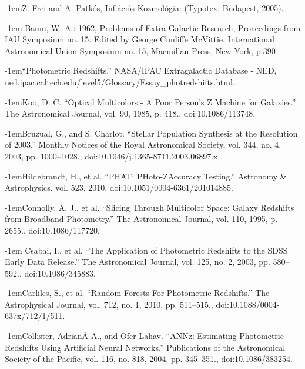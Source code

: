 \documentclass[12pt,letterpaper,oneside,openright]{book}
\begin{document}
\begin{thebibliography}{99\kern\bibindent}
\def\bibindent{1em}

\makeatletter
\let\old@biblabel\@biblabel
\def\@biblabel#1{\old@biblabel{#1}\kern\bibindent}
\let\old@bibitem\bibitem
\def\bibitem#1{\old@bibitem{#1}\leavevmode\kern-\bibindent}
\makeatother
{}
Z. Frei and A. Patkós, Inflációs Kozmológia: (Typotex, Budapest, 2005).



 Baum, W. A.: 1962, Problems of Extra-Galactic Research, Proceedings from IAU Symposium no. 15. Edited by George Cunliffe McVittie. International Astronomical Union Symposium no. 15, Macmillan Press, New York, p.390


“Photometric Redshifts.” NASA/IPAC Extragalactic Database - NED, ned.ipac.caltech.edu/level5/Glossary/Essay\_{}photredshifts.html.


Koo, D. C. “Optical Multicolors - A Poor Person's Z Machine for Galaxies.” The Astronomical Journal, vol. 90, 1985, p. 418., doi:10.1086/113748.

Bruzual, G., and S. Charlot. “Stellar Population Synthesis at the Resolution of 2003.” Monthly Notices of the Royal Astronomical Society, vol. 344, no. 4, 2003, pp. 1000–1028., doi:10.1046/j.1365-8711.2003.06897.x.


Hildebrandt, H., et al. “PHAT: PHoto-ZAccuracy Testing.” Astronomy \&{} Astrophysics, vol. 523, 2010, doi:10.1051/0004-6361/201014885.



Connolly, A. J., et al. “Slicing Through Multicolor Space: Galaxy Redshifts from Broadband Photometry.” The Astronomical Journal, vol. 110, 1995, p. 2655., doi:10.1086/117720.

 Csabai, I., et al. “The Application of Photometric Redshifts to the SDSS Early Data Release.” The Astronomical Journal, vol. 125, no. 2, 2003, pp. 580–592., doi:10.1086/345883.

Carliles, S., et al. “Random Forests For Photometric Redshifts.” The Astrophysical Journal, vol. 712, no. 1, 2010, pp. 511–515., doi:10.1088/0004-637x/712/1/511.

Collister, AdrianÂ A., and Ofer Lahav. “ANNz: Estimating Photometric Redshifts Using Artificial Neural Networks.” Publications of the Astronomical Society of the Pacific, vol. 116, no. 818, 2004, pp. 345–351., doi:10.1086/383254.


\end{thebibliography}
\end{document}
